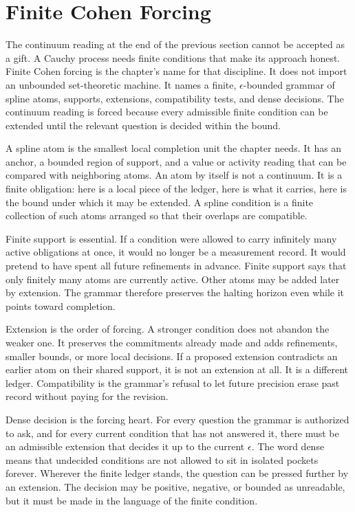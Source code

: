 \section{Finite Cohen Forcing}

The continuum reading at the end of the previous section cannot be accepted
as a gift. A Cauchy process needs finite conditions that make its approach
honest. Finite Cohen forcing is the chapter's name for that discipline. It
does not import an unbounded set-theoretic machine. It names a finite,
\(\epsilon\)-bounded grammar of spline atoms, supports, extensions,
compatibility tests, and dense decisions. The continuum reading is forced
because every admissible finite condition can be extended until the relevant
question is decided within the bound.

A spline atom is the smallest local completion unit the chapter needs. It
has an anchor, a bounded region of support, and a value or activity reading
that can be compared with neighboring atoms. An atom by itself is not a
continuum. It is a finite obligation: here is a local piece of the ledger,
here is what it carries, here is the bound under which it may be extended.
A spline condition is a finite collection of such atoms arranged so that
their overlaps are compatible.

Finite support is essential. If a condition were allowed to carry infinitely
many active obligations at once, it would no longer be a measurement record.
It would pretend to have spent all future refinements in advance. Finite
support says that only finitely many atoms are currently active. Other atoms
may be added later by extension. The grammar therefore preserves the
halting horizon even while it points toward completion.

Extension is the order of forcing. A stronger condition does not abandon the
weaker one. It preserves the commitments already made and adds refinements,
smaller bounds, or more local decisions. If a proposed extension contradicts
an earlier atom on their shared support, it is not an extension at all. It is
a different ledger. Compatibility is the grammar's refusal to let future
precision erase past record without paying for the revision.

Dense decision is the forcing heart. For every question the grammar is
authorized to ask, and for every current condition that has not answered it,
there must be an admissible extension that decides it up to the current
\(\epsilon\). The word dense means that undecided conditions are not allowed
to sit in isolated pockets forever. Wherever the finite ledger stands, the
question can be pressed further by an extension. The decision may be
positive, negative, or bounded as unreadable, but it must be made in the
language of the finite condition.

